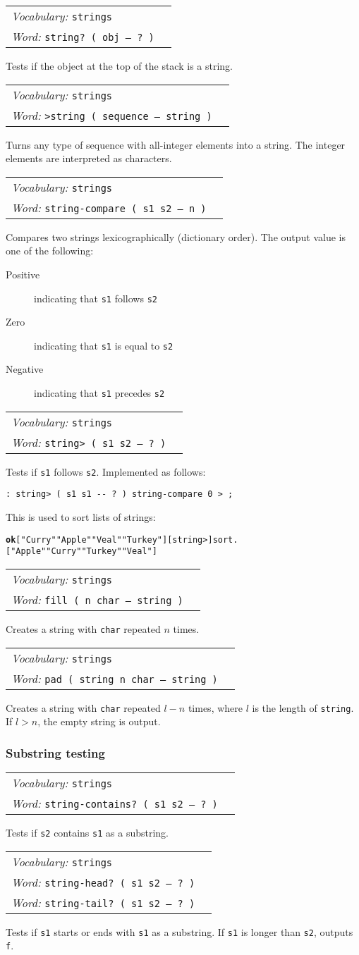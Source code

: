 \documentclass{book}
\newcommand{\vocabulary}[1]{\emph{Vocabulary:} \texttt{#1}&\\}
\newcommand{\ordinaryword}[2]{\index{\texttt{#1}}\emph{Word:} \texttt{#2}&\\}
\newcommand{\wordtable}[1]{

\begin{tabularx}{12cm}[t]{lX}
\hline
#1
\hline
\end{tabularx}

}
\begin{document}
\wordtable{
\vocabulary{strings}
\ordinaryword{string?}{string?~( obj -- ?~)}

}
Tests if the object at the top of the stack is a string.
\wordtable{
\vocabulary{strings}
\ordinaryword{>string}{>string~( sequence -- string )}
}
Turns any type of sequence with all-integer elements into a string. The integer elements are interpreted as characters.
\wordtable{
\vocabulary{strings}
\ordinaryword{string-compare}{string-compare~( s1 s2 -- n )}

}
Compares two strings lexicographically (dictionary order). The output value is one of the following:
\begin{description}
\item[Positive] indicating that \texttt{s1} follows \texttt{s2}
\item[Zero] indicating that \texttt{s1} is equal to \texttt{s2}
\item[Negative] indicating that \texttt{s1} precedes \texttt{s2}
\end{description}
\wordtable{
\vocabulary{strings}
\ordinaryword{string>}{string> ( s1 s2 -- ?~)}

}
Tests if \texttt{s1} follows \texttt{s2}. Implemented as follows:
\begin{verbatim}
: string> ( s1 s1 -- ? ) string-compare 0 > ;
\end{verbatim}
This is used to sort lists of strings:
\begin{alltt}
\textbf{ok} [ "Curry" "Apple" "Veal" "Turkey" ] [ string> ] sort .
[ "Apple" "Curry" "Turkey" "Veal" ]
\end{alltt}
\wordtable{
\vocabulary{strings}
\ordinaryword{fill}{fill~( n char -- string )}

}
Creates a string with \texttt{char} repeated $n$ times.
\wordtable{
\vocabulary{strings}
\ordinaryword{pad}{pad~( string n char -- string )}

}
Creates a string with \texttt{char} repeated $l-n$ times, where $l$ is the length of \texttt{string}. If $l>n$, the empty string is output.

\subsubsection{Substring testing}

\wordtable{
\vocabulary{strings}
\ordinaryword{string-contains?}{string-contains?~( s1 s2 -- ?~)}
}
Tests if \texttt{s2} contains \texttt{s1} as a substring.
\wordtable{
\vocabulary{strings}
\ordinaryword{string-head?}{string-head?~( s1 s2 -- ?~)}
\ordinaryword{string-tail?}{string-tail?~( s1 s2 -- ?~)}

}
Tests if \texttt{s1} starts or ends with \texttt{s1} as a substring. If \texttt{s1} is longer than \texttt{s2}, outputs \texttt{f}.
\end{document}
